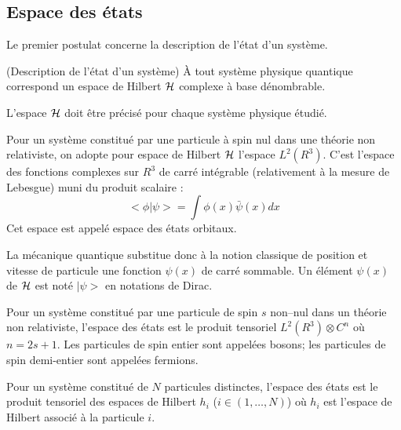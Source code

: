 \documentclass[12pt]{book}
\begin{document}
\subsection{Espace des \'etats}
Le premier postulat concerne la description de l'\'etat d'un
syst\`eme. 
\begin{postulat}
(Description de l'\'etat d'un syst\`eme) \`A tout syst\`eme physique
quantique correspond un espace de Hilbert 
${\cal H}$ complexe \`a base d\'enombrable.
\end{postulat}
L'espace ${\cal H}$ doit \^etre pr\'ecis\'e pour chaque syst\`eme
physique \'etudi\'e.
\begin{exmp}
Pour un syst\`eme constitu\'e par une particule \`a spin nul dans une
th\'eorie non relativiste, on adopte pour espace de Hilbert ${\cal H}$ l'espace $L^2(R^3)$. C'est l'espace des fonctions complexes sur
$R^3$ de carr\'e int\'egrable (relativement \`a la mesure de Lebesgue)
muni du produit scalaire :
\begin{equation}
<\phi|\psi>=\int \phi(x)\bar\psi(x) dx
\end{equation}
Cet espace est appel\'e espace des \'etats orbitaux. 
\end{exmp}
La m\'ecanique quantique substitue donc \`a la notion classique de
position et vitesse de particule une fonction $\psi(x)$ de carr\'e
sommable. Un \'el\'ement $\psi(x)$ de $\cal H$ est not\'e $|\psi>$ en
notations de Dirac.
\begin{exmp}
Pour un syst\`eme constitu\'e par une particule de spin
$s$ non--nul dans un th\'eorie non relativiste, l'espace
des \'etats est le produit 
tensoriel $L^2(R^3)\otimes C^n$ o\`u $n=2s+1$.
Les particules de spin entier sont appel\'ees bosons;
les particules 
de spin demi-entier sont appel\'ees fermions. 
\end{exmp}
\begin{exmp}
Pour un syst\`eme constitu\'e de $N$ particules distinctes, l'espace
des \'etats est le produit tensoriel des espaces de Hilbert $h_i$ ($i
\in (1,\dots,N)$)
o\`u $h_i$ est l'espace de Hilbert associ\'e \`a la particule $i$.
\end{exmp}
\end{document}
